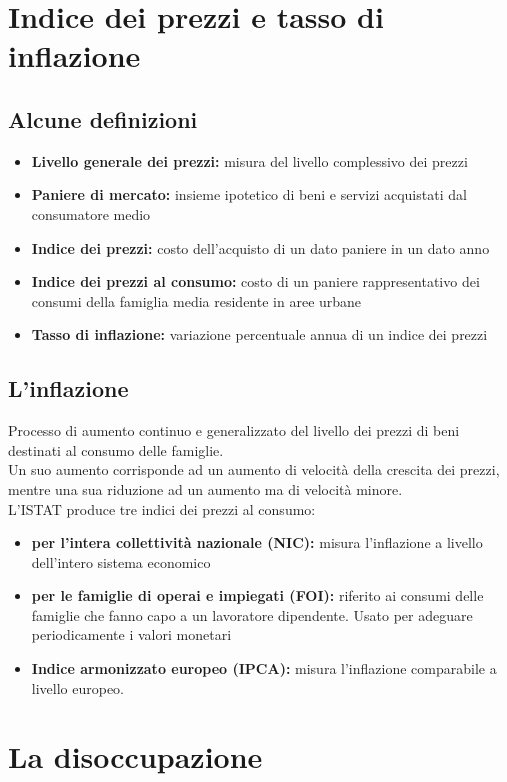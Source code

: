 \documentclass{report}
\begin{document}
	\section{Indice dei prezzi e tasso di inflazione}
	\subsection{Alcune definizioni}
	\begin{itemize}
		\item \textbf{Livello generale dei prezzi:} misura del livello complessivo dei prezzi
		\item \textbf{Paniere di mercato:} insieme ipotetico di beni e servizi acquistati dal consumatore medio
		\item \textbf{Indice dei prezzi:} costo dell'acquisto di un dato paniere in un dato anno
		\item \textbf{Indice dei prezzi al consumo:} costo di un paniere rappresentativo dei consumi della famiglia media residente in aree urbane
		\item \textbf{Tasso di inflazione:} variazione percentuale annua di un indice dei prezzi
	\end{itemize}
	\subsection{L'inflazione}
	Processo di aumento continuo e generalizzato del livello dei prezzi di beni destinati al consumo delle famiglie.\medskip \\Un suo aumento corrisponde ad un aumento di velocità della crescita dei prezzi, mentre una sua riduzione ad un aumento ma di velocità minore.\medskip \\
	L'ISTAT produce tre indici dei prezzi al consumo:
	\begin{itemize}
		\item \textbf{per l'intera collettività nazionale (NIC):} misura l'inflazione a livello dell'intero sistema economico
		\item \textbf{per le famiglie di operai e impiegati (FOI):} riferito ai consumi delle famiglie che fanno capo a un lavoratore dipendente. Usato per adeguare periodicamente i valori monetari
		\item \textbf{Indice armonizzato europeo (IPCA):} misura l'inflazione comparabile a livello europeo.
	\end{itemize}
	\section{La disoccupazione}
\end{document}
